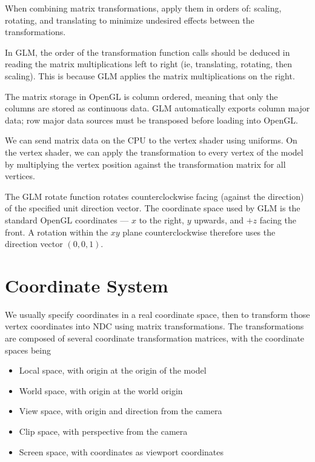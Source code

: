 \documentclass[11pt]{article}
\numberwithin{equation}{section}
\begin{document}
When combining matrix transformations, apply them in orders of: scaling, rotating, and translating to minimize undesired effects between the transformations.

In GLM, the order of the transformation function calls should be deduced in reading the matrix multiplications left to right (ie, translating, rotating, then scaling). This is because GLM applies the matrix multiplications on the right.

The matrix storage in OpenGL is column ordered, meaning that only the columns are stored as continuous data. GLM automatically exports column major data; row major data sources must be transposed before loading into OpenGL.

We can send matrix data on the CPU to the vertex shader using uniforms. On the vertex shader, we can apply the transformation to every vertex of the model by multiplying the vertex position against the transformation matrix for all vertices.

The GLM rotate function rotates counterclockwise facing (against the direction) of the specified unit direction vector. The coordinate space used by GLM is the standard OpenGL coordinates --- $x$ to the right, $y$ upwards, and $+z$ facing the front. A rotation within the $xy$ plane counterclockwise therefore uses the direction vector $(0, 0, 1)$.

\section{Coordinate System}
We usually specify coordinates in a real coordinate space, then to transform those vertex coordinates into NDC using matrix transformations. The transformations are composed of several coordinate transformation matrices, with the coordinate spaces being
\begin{itemize}
	\item Local space, with origin at the origin of the model
	\item World space, with origin at the world origin
	\item View space, with origin and direction from the camera
	\item Clip space, with perspective from the camera
	\item Screen space, with coordinates as viewport coordinates
\end{itemize}
\end{document}
